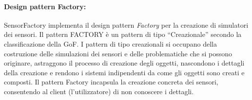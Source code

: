 \paragraph{Design pattern Factory:}
SensorFactory implementa il design pattern \textit{Factory} per la creazione di simulatori dei sensori.
Il pattern FACTORY è un pattern di tipo “Creazionale” secondo la classificazione della GoF.
I pattern di tipo creazionali si occupano della costruzione delle simulazioni dei sensori e delle problematiche che si possono originare, astraggono il processo di creazione degli oggetti, nascondono i dettagli della creazione e rendono i sistemi indipendenti da come gli oggetti sono creati e composti.
Il pattern Factory incapsula la creazione concreta dei sensori, consentendo al client
(l’utilizzatore) di non conoscere i dettagli.


